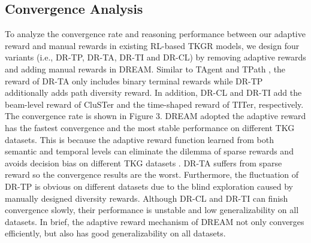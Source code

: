 \documentclass[sigconf,natbib=true]{acmart}
\begin{document}
\subsection{Convergence Analysis}
To analyze the convergence rate and reasoning performance between our adaptive reward and manual rewards in existing RL-based TKGR models, we design four variants (i.e., DR-TP, DR-TA, DR-TI and DR-CL) by removing adaptive rewards and adding manual rewards in DREAM. Similar to  TAgent \cite{TAgent} and TPath \cite{TPath}, the reward of DR-TA only includes binary terminal rewards while DR-TP additionally adds path diversity reward. In addition, DR-CL and DR-TI add the beam-level reward of CluSTer \cite{Cluster} and the time-shaped reward of TITer\cite{TiTer}, respectively. The convergence rate is shown in Figure 3. DREAM adopted the adaptive reward has the fastest convergence and the most stable performance on different TKG datasets. This is because the adaptive reward function learned from both semantic and temporal levels can eliminate the dilemma of sparse rewards and avoids decision bias on different TKG datasets \cite{RLregener}. DR-TA suffers from sparse reward so the convergence results are the worst. Furthermore, the fluctuation of DR-TP is obvious on different datasets due to the blind exploration caused by manually designed diversity rewards. Although DR-CL and DR-TI can finish convergence slowly, their performance is unstable and low generalizability on all  datasets. In brief, the adaptive reward mechanism of DREAM not only converges efficiently, but also has good generalizability on all datasets. 
\end{document}
